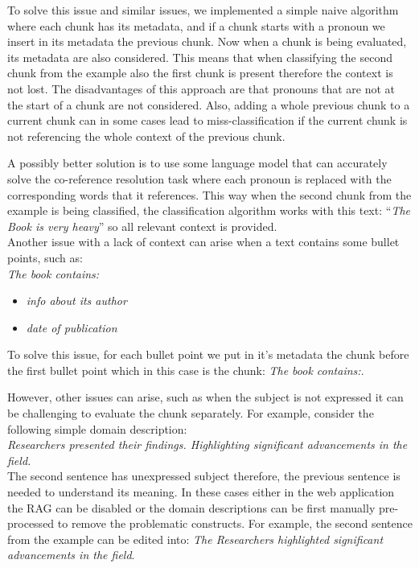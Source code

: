 To solve this issue and similar issues, we implemented a simple naive algorithm where each chunk has its metadata, and if a chunk starts with a pronoun we insert in its metadata the previous chunk. Now when a chunk is being evaluated, its metadata are also considered. This means that when classifying the second chunk from the example also the first chunk is present therefore the context is not lost. The disadvantages of this approach are that pronouns that are not at the start of a chunk are not considered. Also, adding a whole previous chunk to a current chunk can in some cases lead to miss-classification if the current chunk is not referencing the whole context of the previous chunk.

A possibly better solution is to use some language model that can accurately solve the co-reference resolution task where each pronoun is replaced with the corresponding words that it references. This way when the second chunk from the example is being classified, the classification algorithm works with this text: ``\textit{The Book is very heavy}'' so all relevant context is provided. \\

Another issue with a lack of context can arise when a text contains some bullet points, such as: \\

\noindent{}\textit{The book contains:}
\begin{itemize}
\item \textit{info about its author}
\item \textit{date of publication} \\
\end{itemize}

\noindent{}To solve this issue, for each bullet point we put in it's metadata the chunk before the first bullet point which in this case is the chunk: \textit{The book contains:}.

However, other issues can arise, such as when the subject is not expressed it can be challenging to evaluate the chunk separately. For example, consider the following simple domain description: \\

\noindent{}\textit{Researchers presented their findings. Highlighting significant advancements in the field.} \\

\noindent{}The second sentence has unexpressed subject therefore, the previous sentence is needed to understand its meaning. In these cases either in the web application the RAG can be disabled or the domain descriptions can be first manually pre-processed to remove the problematic constructs. For example, the second sentence from the example can be edited into: \textit{The Researchers highlighted significant advancements in the field}. 


